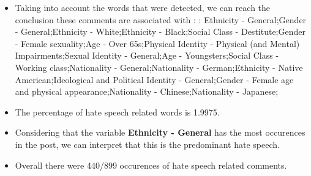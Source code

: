 \documentclass[11pt]{article}
\begin{document}
\begin{itemize}\item Taking into account the words that were detected, we can reach the conclusion these comments are associated with : : Ethnicity - General;Gender - General;Ethnicity - White;Ethnicity - Black;Social Class - Destitute;Gender - Female sexuality;Age - Over 65s;Physical Identity - Physical (and Mental) Impairments;Sexual Identity - General;Age - Youngsters;Social Class - Working class;Nationality - General;Nationality - German;Ethnicity - Native American;Ideological and Political Identity - General;Gender - Female age and physical appearance;Nationality - Chinese;Nationality - Japanese;%

\item The percentage of hate speech related words is 1.9975.

\item Considering that the variable \textbf{Ethnicity - General} has the most occurences in the post, we can interpret that this is the predominant hate speech.

\item Overall there were 440/899 occurences of hate speech related comments.\end{itemize}
\end{document}
